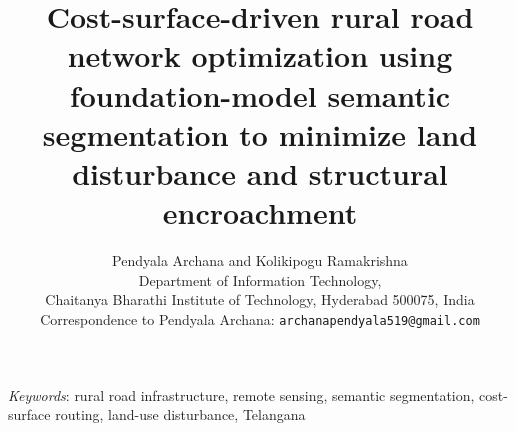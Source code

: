 \documentclass[11pt,a4paper]{article}
\title{Cost-surface-driven rural road network optimization using foundation-model semantic segmentation to minimize land disturbance and structural encroachment}
\author{Pendyala Archana and Kolikipogu Ramakrishna\\[3pt]
\small Department of Information Technology,\\
\small Chaitanya Bharathi Institute of Technology, Hyderabad 500075, India\\
\small Correspondence to Pendyala Archana: \texttt{archanapendyala519@gmail.com}}
\date{}
\begin{document}
\maketitle
\begin{abstract}
\noindent
\end{abstract}
\noindent\textit{Keywords}: rural road infrastructure, remote sensing, semantic segmentation, cost-surface routing, land-use disturbance, Telangana




\end{document}
